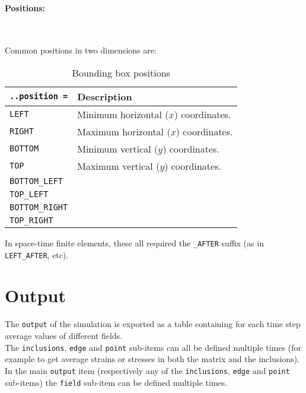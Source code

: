 \documentclass[10pt]{article}
\newcommand{\whiteline}{\textcolor{white}{.\\}}
\begin{document}
\paragraph{Positions:} \whiteline

Common positions in two dimensions are:

\begin{table}[h!]
\begin{tabularx}{\textwidth}{lX}
\verb+..position =+ & Description\\
\hline
\verb+LEFT+ & Minimum horizontal ($x$) coordinates. \\
\verb+RIGHT+ & Maximum horizontal ($x$) coordinates. \\
\verb+BOTTOM+ & Minimum vertical ($y$) coordinates. \\
\verb+TOP+ & Maximum vertical ($y$) coordinates. \\
\verb+BOTTOM_LEFT+ & \\
\verb+TOP_LEFT+ & \\
\verb+BOTTOM_RIGHT+ &  \\
\verb+TOP_RIGHT+ & \\
\hline
\end{tabularx}
\caption{Bounding box positions}
\end{table}

In space-time finite elements, these all required the \verb+_AFTER+ suffix (as in \verb+LEFT_AFTER+, etc).

\section{Output}

The \verb+output+ of the simulation is exported as a table containing for each time step average values of different fields.\\

The \verb+inclusions+, \verb+edge+ and \verb+point+ sub-items can all be defined multiple times (for example to get average strains or stresses in both the matrix and the inclusions).\\

In the main \verb+output+ item (respectively any of the \verb+inclusions+, \verb+edge+ and \verb+point+ sub-items) the \verb+field+ sub-item can be defined multiple times. 

\eject
\end{document}
